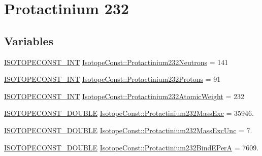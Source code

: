 \hypertarget{group___isotope_const-_protactinium-_pa232}{}\section{Protactinium 232}
\label{group___isotope_const-_protactinium-_pa232}
\subsection*{Variables}
\begin{DoxyCompactItemize}
\item 
\mbox{\hyperlink{group___isotope_const-_macros_ga5f18360b3e99483a35c32d789e62621c}{I\+S\+O\+T\+O\+P\+E\+C\+O\+N\+S\+T\+\_\+\+I\+NT}} \mbox{\hyperlink{group___isotope_const-_protactinium-_pa232_ga64bdae1ac078d42433b11cfbb1844413}{Isotope\+Const\+::\+Protactinium232\+Neutrons}} = 141
\item 
\mbox{\hyperlink{group___isotope_const-_macros_ga5f18360b3e99483a35c32d789e62621c}{I\+S\+O\+T\+O\+P\+E\+C\+O\+N\+S\+T\+\_\+\+I\+NT}} \mbox{\hyperlink{group___isotope_const-_protactinium-_pa232_gaeb654ec6e8e72a361ad00e3bd42efc10}{Isotope\+Const\+::\+Protactinium232\+Protons}} = 91
\item 
\mbox{\hyperlink{group___isotope_const-_macros_ga5f18360b3e99483a35c32d789e62621c}{I\+S\+O\+T\+O\+P\+E\+C\+O\+N\+S\+T\+\_\+\+I\+NT}} \mbox{\hyperlink{group___isotope_const-_protactinium-_pa232_gac1444373d1d6ef0eeef96840574588fd}{Isotope\+Const\+::\+Protactinium232\+Atomic\+Weight}} = 232
\item 
\mbox{\hyperlink{group___isotope_const-_macros_ga8f45a7272ce02c0b4c65c44636ed719a}{I\+S\+O\+T\+O\+P\+E\+C\+O\+N\+S\+T\+\_\+\+D\+O\+U\+B\+LE}} \mbox{\hyperlink{group___isotope_const-_protactinium-_pa232_ga5234eb328524cf6ca99f849107350ef5}{Isotope\+Const\+::\+Protactinium232\+Mass\+Exc}} = 35946.
\item 
\mbox{\hyperlink{group___isotope_const-_macros_ga8f45a7272ce02c0b4c65c44636ed719a}{I\+S\+O\+T\+O\+P\+E\+C\+O\+N\+S\+T\+\_\+\+D\+O\+U\+B\+LE}} \mbox{\hyperlink{group___isotope_const-_protactinium-_pa232_gacc47e4621bd5712ee0bf546e4707b8d9}{Isotope\+Const\+::\+Protactinium232\+Mass\+Exc\+Unc}} = 7.
\item 
\mbox{\hyperlink{group___isotope_const-_macros_ga8f45a7272ce02c0b4c65c44636ed719a}{I\+S\+O\+T\+O\+P\+E\+C\+O\+N\+S\+T\+\_\+\+D\+O\+U\+B\+LE}} \mbox{\hyperlink{group___isotope_const-_protactinium-_pa232_ga776d6bbfb2ed5cc29a0231adc9d750ba}{Isotope\+Const\+::\+Protactinium232\+Bind\+E\+PerA}} = 7609.

\end{DoxyCompactItemize}
